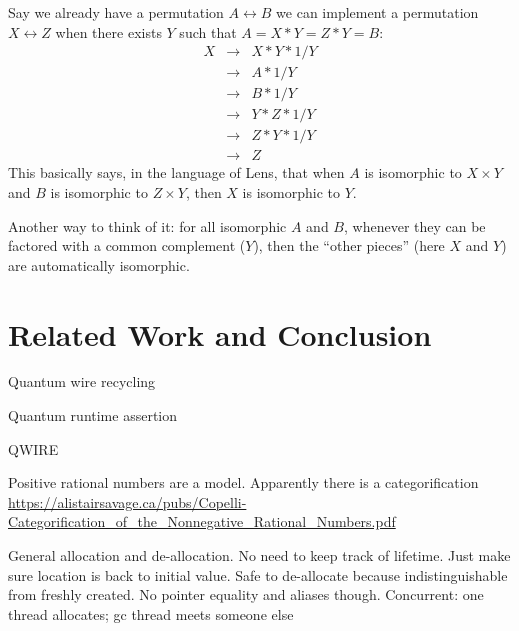 \documentclass[sigplan,10pt,review,anonymous]{acmart}
\begin{document}
Say we already have a permutation $A \leftrightarrow B$
we can implement a permutation $X \leftrightarrow Z$ 
when there exists $Y$ such that $A = X * Y = Z * Y = B$:
\[\begin{array}{rcl}
X &\rightarrow& X * Y * 1/Y \\
  &\rightarrow& A * 1/Y \\
  &\rightarrow&  B * 1/Y \\
  &\rightarrow&  Y * Z * 1/Y \\
  &\rightarrow&  Z * Y * 1/Y \\
  &\rightarrow&  Z
\end{array}\]
This basically says, in the language of Lens, that
when $A$ is isomorphic to $X \times Y$ and
$B$ is isomorphic to $Z \times Y$, then
$X$ is isomorphic to $Y$.

Another way to think of it: for all isomorphic
$A$ and $B$, whenever they can be factored with a
common complement ($Y$), then the ``other pieces''
(here $X$ and $Y$) are automatically isomorphic.

\section{Related Work and Conclusion}

Quantum wire recycling~\cite{PhysRevA.94.042337}

Quantum runtime assertion~\cite{DBLP:journals/cal/ZhouB19}

QWIRE~\cite{Paykin:2017:QCL:3009837.3009894}

Positive rational numbers are a model. Apparently there is a
categorification
\url{https://alistairsavage.ca/pubs/Copelli-Categorification_of_the_Nonnegative_Rational_Numbers.pdf}

General allocation and de-allocation. No need to keep track of
lifetime. Just make sure location is back to initial value. Safe to
de-allocate because indistinguishable from freshly created. No pointer
equality and aliases though. Concurrent: one thread allocates; gc
thread meets someone else


\end{document}
